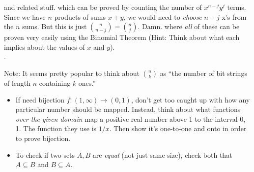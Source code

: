 \documentclass[12pt]{article}
\newcommand{\myspace}{\vspace{2\bigskipamount}}
\newcommand\p{\Needspace{12\baselineskip} \noindent}
\begin{document}
\p {} and related stuff. 
which can be proved by counting the number of  $x^{n-j} y^j$ terms. Since we have $n$ products of sums $x + y$, we would need to \textit{choose} $n - j$ x's from the $n$ sums. But this is just $\binom{n}{n - j} = \binom{n}{j}$. Damn. 
where \emph{all} of these can be proven very easily using the Binomial Theorem (Hint: Think about what each implies about the values of $x$ and $y$). \\

\p {}. 
\myspace

\p Note: It seems pretty popular to think about $\binom{n}{k}$ as ``the number of bit strings of length $n$ containing $k$ ones.'' 

\newcommand\thought[1]{\begin{small}\textit{#1}\end{small}}

\p {}
\begin{itemize}[$\rightarrow$]
	\item \green{[FA15.4.a]} If need bijection $f : (1, \infty) \rightarrow (0, 1)$, don't get too caught up with how any particular number should be mapped. Instead, think about what functions \textit{over the given domain} map a positive real number above 1 to the interval 0, 1. The function they use is $1/x$. Then show it's one-to-one and onto in order to prove bijection. 
	
	\item To check if two sets $A, B$ are \textit{equal} (not just same size), check both that $A \subseteq B$ and $B \subseteq A$. 
\end{itemize}
\myspace
\end{document}
